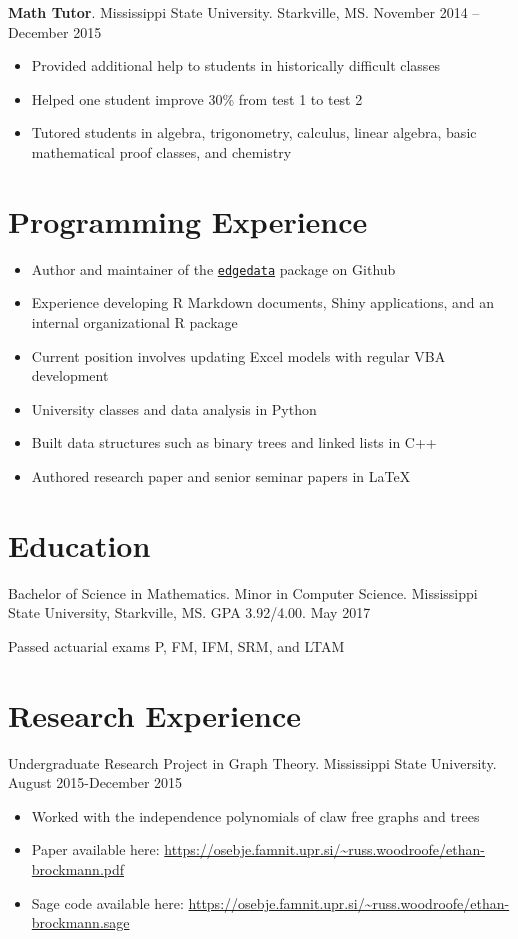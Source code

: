 \documentclass[11pt, a4paper]{awesome-cv}
\begin{document}
\textbf{Math Tutor}. Mississippi State University. Starkville, MS.
November 2014 -- December 2015

\begin{itemize}
\item
  Provided additional help to students in historically difficult classes
\item
  Helped one student improve 30\% from test 1 to test 2
\item
  Tutored students in algebra, trigonometry, calculus, linear algebra,
  basic mathematical proof classes, and chemistry
\end{itemize}

\hypertarget{programming-experience}{%
\section{Programming Experience}\label{programming-experience}}

\begin{itemize}
\item
  Author and maintainer of the
  \href{https://github.com/ArctiCondor/edgedata}{\texttt{edgedata}}
  package on Github
\item
  Experience developing R Markdown documents, Shiny applications, and an
  internal organizational R package
\item
  Current position involves updating Excel models with regular VBA
  development
\item
  University classes and data analysis in Python
\item
  Built data structures such as binary trees and linked lists in C++
\item
  Authored research paper and senior seminar papers in \LaTeX
\end{itemize}

\hypertarget{education}{%
\section{Education}\label{education}}

Bachelor of Science in Mathematics. Minor in Computer Science.
Mississippi State University, Starkville, MS. GPA 3.92/4.00. May 2017

Passed actuarial exams P, FM, IFM, SRM, and LTAM

\hypertarget{research-experience}{%
\section{Research Experience}\label{research-experience}}

Undergraduate Research Project in Graph Theory. Mississippi State
University. August 2015-December 2015

\begin{itemize}
\item
  Worked with the independence polynomials of claw free graphs and trees
\item
  Paper available here:
  \url{https://osebje.famnit.upr.si/~russ.woodroofe/ethan-brockmann.pdf}
\item
  Sage code available here:
  \url{https://osebje.famnit.upr.si/~russ.woodroofe/ethan-brockmann.sage}
\end{itemize}
\end{document}

